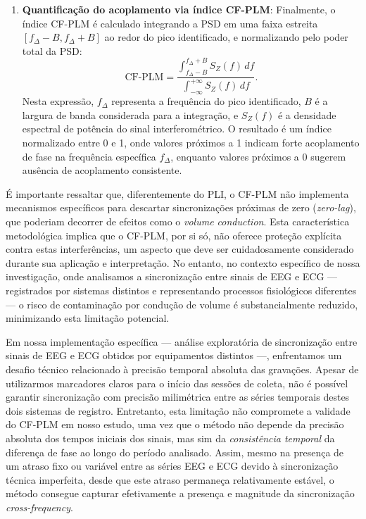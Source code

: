 \begin{enumerate}
    \item \textbf{Quantificação do acoplamento via índice CF-PLM}: Finalmente, o índice CF-PLM é calculado integrando a PSD em uma faixa estreita \([f_\Delta - B, f_\Delta + B]\) ao redor do pico identificado, e normalizando pelo poder total da PSD:
    \[
    \text{CF-PLM} = \frac{\displaystyle\int_{f_\Delta - B}^{f_\Delta + B} S_Z(f) \, df}{\displaystyle\int_{-\infty}^{+\infty} S_Z(f) \, df}.
    \]
    Nesta expressão, \(f_\Delta\) representa a frequência do pico identificado, \(B\) é a largura de banda considerada para a integração, e \(S_Z(f)\) é a densidade espectral de potência do sinal interferométrico. O resultado é um índice normalizado entre 0 e 1, onde valores próximos a 1 indicam forte acoplamento de fase na frequência específica \(f_\Delta\), enquanto valores próximos a 0 sugerem ausência de acoplamento consistente.
\end{enumerate}

É importante ressaltar que, diferentemente do PLI, o CF-PLM não implementa mecanismos específicos para descartar sincronizações próximas de zero (\textit{zero-lag}), que poderiam decorrer de efeitos como o \textit{volume conduction}. Esta característica metodológica implica que o CF-PLM, por si só, não oferece proteção explícita contra estas interferências, um aspecto que deve ser cuidadosamente considerado durante sua aplicação e interpretação. No entanto, no contexto específico de nossa investigação, onde analisamos a sincronização entre sinais de EEG e ECG — registrados por sistemas distintos e representando processos fisiológicos diferentes — o risco de contaminação por condução de volume é substancialmente reduzido, minimizando esta limitação potencial.

Em nossa implementação específica — análise exploratória de sincronização entre sinais de EEG e ECG obtidos por equipamentos distintos —, enfrentamos um desafio técnico relacionado à precisão temporal absoluta das gravações. Apesar de utilizarmos marcadores claros para o início das sessões de coleta, não é possível garantir sincronização com precisão milimétrica entre as séries temporais destes dois sistemas de registro. Entretanto, esta limitação não compromete a validade do CF-PLM em nosso estudo, uma vez que o método não depende da precisão absoluta dos tempos iniciais dos sinais, mas sim da \textit{consistência temporal} da diferença de fase ao longo do período analisado. Assim, mesmo na presença de um atraso fixo ou variável entre as séries EEG e ECG devido à sincronização técnica imperfeita, desde que este atraso permaneça relativamente estável, o método consegue capturar efetivamente a presença e magnitude da sincronização \textit{cross-frequency}.

